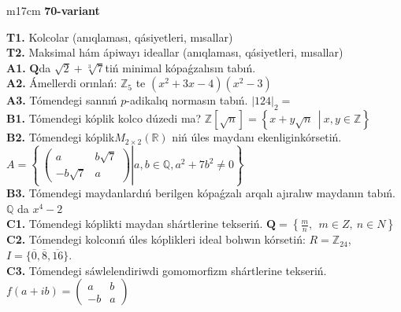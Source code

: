 \documentclass{article}
\begin{document}
\begin{tabular}{m{17cm}}
\textbf{70-variant}
\newline

\textbf{T1.} Kolcolar (anıqlaması, qásiyetleri, mısallar) \\
\textbf{T2.} Maksimal hám ápiwayı ideallar (anıqlaması, qásiyetleri, mısallar) \\
\textbf{A1.} \(\mathbf{Q}\)da \(\sqrt{2} + \sqrt[3]{7}\)tiń minimal kópaǵzalısın tabıń. \\
\textbf{A2.} Ámellerdi orınlań: \(\mathbb{Z}_{5}\) te \(\left( x^{2} + 3x - 4 \right)\left( x^{2} - 3 \right)\) \\
\textbf{A3.} Tómendegi sannıń \(p\)-adikalıq normasın tabıń. \(|124|_{2} =\) \\
\textbf{B1.} Tómendegi kóplik kolco dúzedi ma? \(\mathbb{Z}\left\lbrack \sqrt{n} \right\rbrack = \left\{ x + y\sqrt{n}\ \ \left| \right.\ x,y \in \mathbb{Z} \right\}\) \\
\textbf{B2.} Tómendegi kóplik\(M_{2 \times 2}\left( \mathbb{R} \right)\) niń úles maydanı ekenliginkórsetiń. \(A = \left\{ \left. \ \begin{pmatrix}
a & b\sqrt{7} \\
 - b\sqrt{7} & a
\end{pmatrix} \right|a,b\mathbb{\in Q},a^{2} + 7b^{2} \neq 0 \right\}\) \\
\textbf{B3.} Tómendegi maydanlardıń berilgen kópaǵzalı arqalı ajıralıw maydanın tabıń. \(\mathbb{Q}\) da \(x^{4} - 2\) \\
\textbf{C1.} Tómendegi kóplikti maydan shártlerine tekseriń. \(\mathbf{Q} = \left\{ \frac{m}{n},\ \ m \in Z,\ n \in N \right\}\) \\
\textbf{C2.} Tómendegi kolconıń úles kóplikleri ideal bolıwın kórsetiń:
\(R = \mathbb{Z}_{24}\), \(I = \{\overline{0},\overline{8},\overline{16}\}\). \\
\textbf{C3.} Tómendegi sáwlelendiriwdi gomomorfizm shártlerine tekseriń. \(f(a + ib) = \begin{pmatrix}
a & b \\
 - b & a
\end{pmatrix}\) \\

\end{tabular}
\vspace{1cm}
\end{document}
